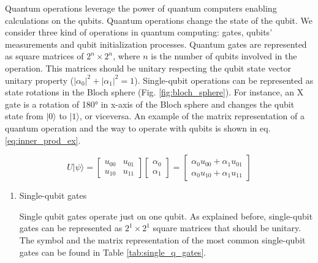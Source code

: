 \begin{enumerate}
Quantum operations leverage the power of quantum computers enabling calculations on the qubits.
Quantum operations change the state of the qubit.
We consider three kind of operations in quantum computing: gates, qubits' measurements and qubit initialization processes.
Quantum gates are represented as square matrices of \(2^{n} \times 2^{n}\), where \(n\) is the number of qubits involved in the operation.
This matrices should be unitary respecting the qubit state vector unitary property (\(|\alpha_0|^2 + |\alpha_1|^2 = 1\)).
Single-qubit operations can be represented as state rotations in the Bloch sphere (Fig. \ref{fig:bloch_sphere}).
For instance, an X gate is a rotation of 180° in x-axis of the Bloch sphere and changes the qubit state from \(| 0 \rangle\) to \(| 1 \rangle\), or viceversa.
An example of the matrix representation of a quantum operation and the way to operate with qubits is shown in eq. \ref{eq:inner_prod_ex}.

\begin{equation}
\label{eq:inner_prod_ex}
U |\psi\rangle=\begin{bmatrix}u_{00}&u_{01}\\u_{10}&u_{11}\end{bmatrix} \begin{bmatrix}\alpha_0 \\ \alpha_1 \end{bmatrix} = \begin{bmatrix}\alpha_0 u_{00} + \alpha_1 u_{01} \\ \alpha_0 u_{10} + \alpha_1 u_{11} \end{bmatrix}
\end{equation}


\begin{enumerate}
\item Single-qubit gates
\label{sec:orgdcd22f5}

Single qubit gates operate just on one qubit.
As explained before, single-qubit gates can be represented as \(2^1 \times 2^1\) square matrices that should be unitary.
The symbol and the matrix representation of the most common single-qubit gates can be found in Table \ref{tab:single_q_gates}.


\end{enumerate}
\end{enumerate}

